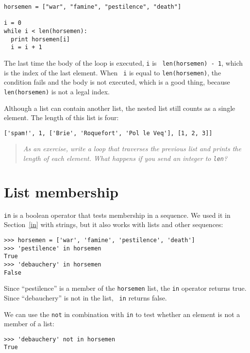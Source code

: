 \pagebreak

\beforeverb
\begin{verbatim}
horsemen = ["war", "famine", "pestilence", "death"]

i = 0
while i < len(horsemen):
  print horsemen[i]
  i = i + 1
\end{verbatim}
\afterverb
%
The last time the body of the loop is executed, {\tt i} is {\tt
len(horsemen) - 1}, which is the index of the last element.  When {\tt
i} is equal to {\tt len(horsemen)}, the condition fails and the body
is not executed, which is a good thing, because {\tt len(horsemen)} is
not a legal index.

Although a list can contain another list, the nested
list still counts as a single element.  The length of this list is
four:

\beforeverb
\begin{verbatim}
['spam!', 1, ['Brie', 'Roquefort', 'Pol le Veq'], [1, 2, 3]]
\end{verbatim}
\afterverb
%
\begin{quote}
{\em As an exercise, write a loop that traverses the previous
list and prints the length of each element.  What happens if
you send an integer to {\tt len}?}
\end{quote}


\section{List membership}

{\tt in} is a boolean operator that tests membership in a sequence.
We used it in Section~\ref{in} with strings, but it also works with
lists and other sequences:

\beforeverb
\begin{verbatim}
>>> horsemen = ['war', 'famine', 'pestilence', 'death']
>>> 'pestilence' in horsemen
True
>>> 'debauchery' in horsemen
False
\end{verbatim}
\afterverb

Since ``pestilence'' is a member of the {\tt horsemen} list, the {\tt in}
operator returns true.  Since ``debauchery'' is not in the list, {\tt
in} returns false.

We can use the {\tt not} in combination
with {\tt in} to test whether an element is not a member of a list:

\beforeverb
\begin{verbatim}
>>> 'debauchery' not in horsemen
True
\end{verbatim}
\afterverb



